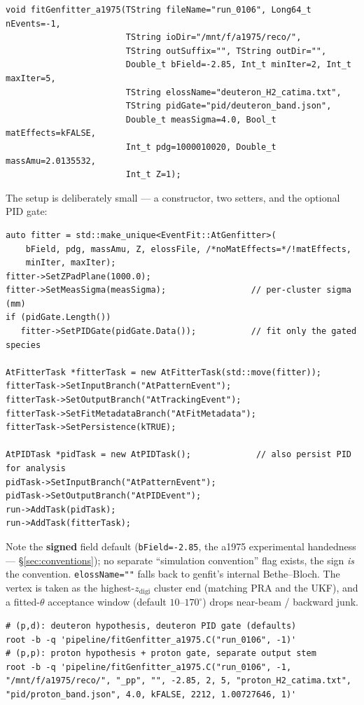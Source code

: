 \documentclass[11pt,a4paper]{article}
\newcommand{\code}[1]{\texttt{\small #1}}
\begin{document}
\begin{lstlisting}
void fitGenfitter_a1975(TString fileName="run_0106", Long64_t nEvents=-1,
                        TString ioDir="/mnt/f/a1975/reco/",
                        TString outSuffix="", TString outDir="",
                        Double_t bField=-2.85, Int_t minIter=2, Int_t maxIter=5,
                        TString elossName="deuteron_H2_catima.txt",
                        TString pidGate="pid/deuteron_band.json",
                        Double_t measSigma=4.0, Bool_t matEffects=kFALSE,
                        Int_t pdg=1000010020, Double_t massAmu=2.0135532,
                        Int_t Z=1);
\end{lstlisting}

The setup is deliberately small --- a constructor, two setters, and the optional
PID gate:

\begin{lstlisting}
auto fitter = std::make_unique<EventFit::AtGenfitter>(
    bField, pdg, massAmu, Z, elossFile, /*noMatEffects=*/!matEffects,
    minIter, maxIter);
fitter->SetZPadPlane(1000.0);
fitter->SetMeasSigma(measSigma);                 // per-cluster sigma (mm)
if (pidGate.Length())
   fitter->SetPIDGate(pidGate.Data());           // fit only the gated species

AtFitterTask *fitterTask = new AtFitterTask(std::move(fitter));
fitterTask->SetInputBranch("AtPatternEvent");
fitterTask->SetOutputBranch("AtTrackingEvent");
fitterTask->SetFitMetadataBranch("AtFitMetadata");
fitterTask->SetPersistence(kTRUE);

AtPIDTask *pidTask = new AtPIDTask();             // also persist PID for analysis
pidTask->SetInputBranch("AtPatternEvent");
pidTask->SetOutputBranch("AtPIDEvent");
run->AddTask(pidTask);
run->AddTask(fitterTask);
\end{lstlisting}

Note the \textbf{signed} field default (\code{bField=-2.85}, the a1975 experimental
handedness --- \S\ref{sec:conventions}); no separate ``simulation convention''
flag exists, the sign \emph{is} the convention. \code{elossName=""} falls back to
genfit's internal Bethe--Bloch. The vertex is taken as the highest-$z_\mathrm{digi}$
cluster end (matching PRA and the UKF), and a fitted-$\theta$ acceptance window
(default $10$--$170^\circ$) drops near-beam / backward junk.

\begin{lstlisting}[style=bash]
# (p,d): deuteron hypothesis, deuteron PID gate (defaults)
root -b -q 'pipeline/fitGenfitter_a1975.C("run_0106", -1)'
# (p,p): proton hypothesis + proton gate, separate output stem
root -b -q 'pipeline/fitGenfitter_a1975.C("run_0106", -1, "/mnt/f/a1975/reco/", "_pp", "", -2.85, 2, 5, "proton_H2_catima.txt", "pid/proton_band.json", 4.0, kFALSE, 2212, 1.00727646, 1)'
\end{lstlisting}
\end{document}
